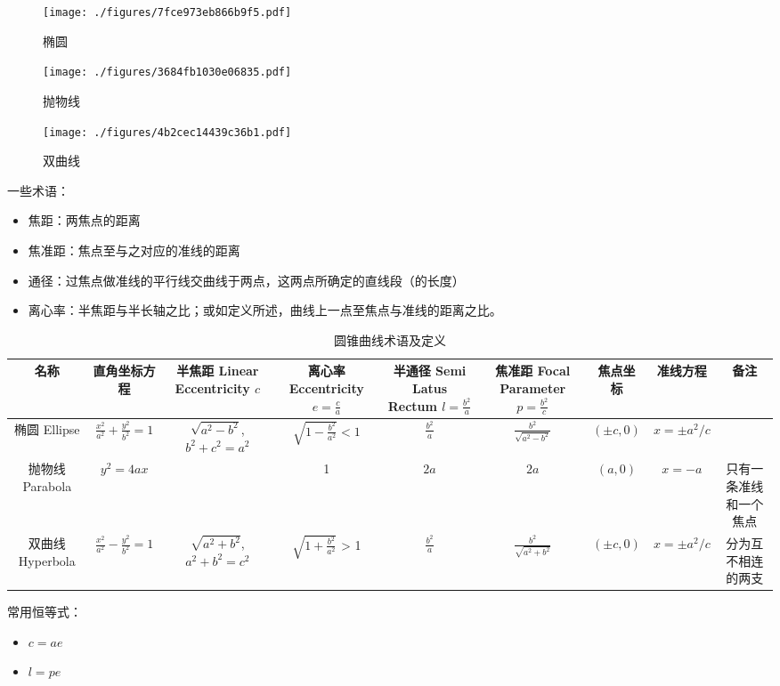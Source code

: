 \begin{figure}[ht]
\centering
\texttt{[image: ./figures/7fce973eb866b9f5.pdf]}
\caption{椭圆} \label{fig_conic_2}
\end{figure}

\begin{figure}[ht]
\centering
\texttt{[image: ./figures/3684fb1030e06835.pdf]}
\caption{抛物线} \label{fig_conic_3}
\end{figure}

\begin{figure}[ht]
\centering
\texttt{[image: ./figures/4b2cec14439c36b1.pdf]}
\caption{双曲线} \label{fig_conic_4}
\end{figure}

一些术语：
\begin{itemize}
\item 焦距：两焦点的距离
\item 焦准距：焦点至与之对应的准线的距离
\item 通径：过焦点做准线的平行线交曲线于两点，这两点所确定的直线段（的长度）
\item 离心率：半焦距与半长轴之比；或如定义所述，曲线上一点至焦点与准线的距离之比。
\end{itemize}

\begin{table}[ht]
\centering
\caption{圆锥曲线术语及定义}\label{tab_conic_1}
\begin{tabular}{|c|c|c|c|c|c|c|c|c|}
\hline
名称 & 直角坐标方程 & 半焦距 Linear Eccentricity $c$ & 离心率 Eccentricity $e = \frac{c}{a}$ & 半通径 Semi Latus Rectum $l=\frac{b^2}{a}$ & 焦准距 Focal Parameter$p=\frac{b^2}{c}$ & 焦点坐标&准线方程 &备注\\
\hline
椭圆 Ellipse & $\frac{x^2}{a^2} + \frac{y^2}{b^2} = 1$ & $\sqrt{a^2-b^2}$, $b^2+c^2=a^2$ & $\sqrt{1-\frac{b^2}{a^2}} < 1$ & $\frac{b^2}{a}$ & $\frac{b^2}{\sqrt{a^2-b^2}}$ & $(\pm c,0)$ & $x=\pm a^2/c$& \\
\hline
抛物线 Parabola & $y^2=4ax$ & \ & 1 & $2a$ & $2a$ & $(a,0)$ & $x=-a$ & 只有一条准线和一个焦点\\
\hline
双曲线 Hyperbola & $\frac{x^2}{a^2} - \frac{y^2}{b^2} = 1$ & $\sqrt{a^2+b^2}$,$a^2+b^2=c^2$ & $\sqrt{1+\frac{b^2}{a^2}}$ > 1 & $\frac{b^2}{a}$ & $\frac{b^2}{\sqrt{a^2+b^2}}$ & $(\pm c,0)$ & $x=\pm a^2/c$ & 分为互不相连的两支 \\
\hline
\end{tabular}
\end{table}

常用恒等式：
\begin{itemize}
\item $c=ae$
\item $l=pe$
\end{itemize}
